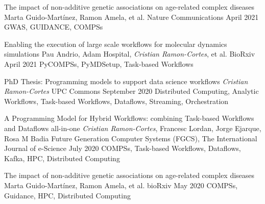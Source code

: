 %
%
%

\newpage


\begin{publications}
    
    \publication
        {The impact of non-additive genetic associations on age-related complex diseases}
        {Marta Guido-Martínez, Ramon Amela, et al.}
        {Nature Communications}
        {April 2021}
        {GWAS, GUIDANCE, COMPSs}
        {}
    
    \publication
        {Enabling the execution of large scale workflows for molecular dynamics simulations}
        {Pau Andrio, Adam Hospital, \textit{Cristian Ramon-Cortes}, et al.}
        {BioRxiv}
        {April 2021}
        {PyCOMPSs, PyMDSetup, Task-based Workflows}
        {}
    
   \publication
        {PhD Thesis: Programming models to support data science workflows}
        {\textit{Cristian Ramon-Cortes}}
        {UPC Commons}
        {September 2020}
        {Distributed Computing, Analytic Workflows, Task-based Workflows, Dataflows, Streaming, Orchestration}
        {}
    
    \publication
        {A Programming Model for Hybrid Workflows: combining Task-based Workflows and Dataflows all-in-one}
        {\textit{Cristian Ramon-Cortes}, Francesc Lordan, Jorge Ejarque, Rosa M Badia}
        {Future Generation Computer Systems (FGCS), The International Journal of e-Science}
        {July 2020}
        {COMPSs, Task-based Workflows, Dataflows, Kafka, HPC, Distributed Computing}
        {}

    \publication
        {The impact of non-additive genetic associations on age-related complex diseases}
        {Marta Guido-Martínez, Ramon Amela, et al.}
        {bioRxiv}
        {May 2020}
        {COMPSs, Guidance, HPC, Distributed Computing}
        {}


\end{publications}
